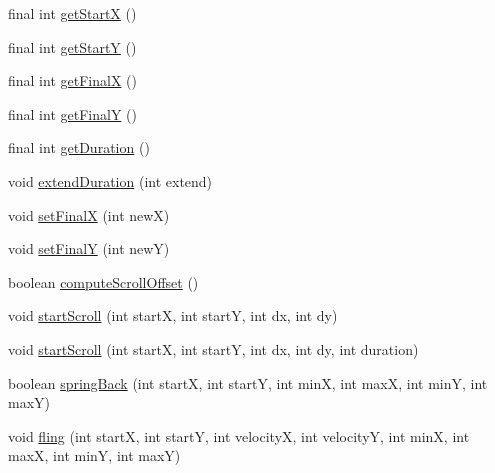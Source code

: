 \begin{DoxyCompactItemize}
\item 
final int \hyperlink{classit_1_1sephiroth_1_1android_1_1library_1_1widget_1_1_over_scroller_a67d3ca611f1b1641b64eb886234cad6a}{get\+StartX} ()
\item 
final int \hyperlink{classit_1_1sephiroth_1_1android_1_1library_1_1widget_1_1_over_scroller_a9d492bf22b3844298eba9670c72a0135}{get\+StartY} ()
\item 
final int \hyperlink{classit_1_1sephiroth_1_1android_1_1library_1_1widget_1_1_over_scroller_aef4f42a8798a79dd8402373d10a7563b}{get\+FinalX} ()
\item 
final int \hyperlink{classit_1_1sephiroth_1_1android_1_1library_1_1widget_1_1_over_scroller_af5ec55a4d070fc31b1a0a7d453e96123}{get\+FinalY} ()
\item 
final int \hyperlink{classit_1_1sephiroth_1_1android_1_1library_1_1widget_1_1_over_scroller_a0e6a139bbc3eb72edce05e31e801636f}{get\+Duration} ()
\item 
void \hyperlink{classit_1_1sephiroth_1_1android_1_1library_1_1widget_1_1_over_scroller_a94c0a3042a747b6212859cc06bf749d5}{extend\+Duration} (int extend)
\item 
void \hyperlink{classit_1_1sephiroth_1_1android_1_1library_1_1widget_1_1_over_scroller_a6cc75f4f959d10d938d62bbc2da639ed}{set\+FinalX} (int newX)
\item 
void \hyperlink{classit_1_1sephiroth_1_1android_1_1library_1_1widget_1_1_over_scroller_a9ef2e1e21a97339f297abd812518828e}{set\+FinalY} (int newY)
\item 
boolean \hyperlink{classit_1_1sephiroth_1_1android_1_1library_1_1widget_1_1_over_scroller_ab45e11f2756ef6e2034cf2c99b67d1aa}{compute\+Scroll\+Offset} ()
\item 
void \hyperlink{classit_1_1sephiroth_1_1android_1_1library_1_1widget_1_1_over_scroller_a8640289a2ddc3d48497882c497850798}{start\+Scroll} (int startX, int startY, int dx, int dy)
\item 
void \hyperlink{classit_1_1sephiroth_1_1android_1_1library_1_1widget_1_1_over_scroller_a01523985aee21b75feba0803afe6a70d}{start\+Scroll} (int startX, int startY, int dx, int dy, int duration)
\item 
boolean \hyperlink{classit_1_1sephiroth_1_1android_1_1library_1_1widget_1_1_over_scroller_a05eaaabb43c95826cd6fdc8fd2619bed}{spring\+Back} (int startX, int startY, int minX, int maxX, int minY, int maxY)
\item 
void \hyperlink{classit_1_1sephiroth_1_1android_1_1library_1_1widget_1_1_over_scroller_a6e941efde417ea0d739fd9d393a4a859}{fling} (int startX, int startY, int velocityX, int velocityY, int minX, int maxX, int minY, int maxY)

\end{DoxyCompactItemize}
